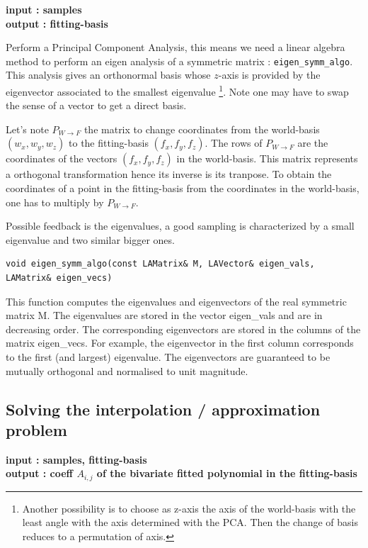 {\bf input : samples\\ output : fitting-basis}

Perform a Principal Component Analysis, this means we need a linear
algebra method to perform an eigen analysis of a symmetric matrix :
{\tt eigen\_symm\_algo}. This analysis gives an orthonormal basis
whose $z$-axis is provided by the eigenvector associated to the
smallest eigenvalue \footnote{Another possibility is to choose as
z-axis the axis of the world-basis with the least angle with the axis
determined with the PCA. Then the change of basis reduces to a
permutation of axis.}. Note one may have to swap the sense of a vector
to get a direct basis.

Let's note $P_{W\rightarrow F}$ the matrix to change coordinates from the
world-basis $(w_x,w_y,w_z)$ to the fitting-basis $(f_x,f_y,f_z)$. The
rows of $P_{W\rightarrow F}$ are the coordinates of the vectors
$(f_x,f_y,f_z)$ in the world-basis. This matrix represents a
orthogonal transformation hence its inverse is its tranpose. To obtain
the coordinates of a point in the fitting-basis from the coordinates
in the world-basis, one has to multiply by $ P_{W\rightarrow F}$.

Possible feedback is the eigenvalues, a good sampling is characterized 
by a small eigenvalue and two similar bigger ones.


\begin{verbatim}
void eigen_symm_algo(const LAMatrix& M, LAVector& eigen_vals, LAMatrix& eigen_vecs)
\end{verbatim} 
This function computes the eigenvalues and eigenvectors of the real
symmetric matrix M. The eigenvalues are stored in the vector
eigen\_vals and are in decreasing order. The corresponding eigenvectors are
stored in the columns of the matrix eigen\_vecs. For example, the
eigenvector in the first column corresponds to the first (and largest)
eigenvalue. The eigenvectors are guaranteed to be mutually orthogonal
and normalised to unit magnitude.

\subsection{Solving the interpolation / approximation problem}
\label{sec:solving}

{\bf input : samples, fitting-basis \\ output : coeff $A_{i,j}$ of the
bivariate fitted polynomial in the fitting-basis }

